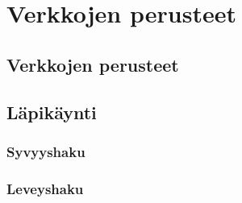 \chapter{Verkkojen perusteet}

\section{Verkkojen perusteet}

\section{Läpikäynti}

\subsection{Syvyyshaku}

\subsection{Leveyshaku}


